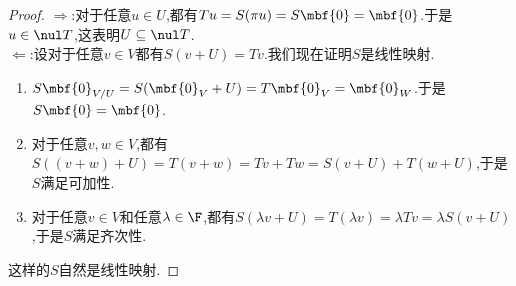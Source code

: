 \documentclass{ctexart}
\begin{document}
\begin{proof}
    $\Rightarrow$:对于任意$u\in U$,都有$Tu=S(\pi u)=S\mbf{0}=\mbf{0}$.于是$u\in\nul T$,这表明$U\subseteq\nul T$.\\
    $\Leftarrow$:设对于任意$v\in V$都有$S(v+U)=Tv$.我们现在证明$S$是线性映射.
    \begin{enumerate}[label=\tbf{(\alph*)}]
        \item $S\mbf{0}_{V/U}=S(\mbf{0}_V+U)=T\mbf{0}_V=\mbf{0}_W$.于是$S\mbf{0}=\mbf{0}$.
        \item 对于任意$v,w\in V$,都有$S((v+w)+U)=T(v+w)=Tv+Tw=S(v+U)+T(w+U)$,于是$S$满足可加性.
        \item 对于任意$v\in V$和任意$\lambda\in\F$,都有$S(\lambda v+U)=T(\lambda v)=\lambda Tv=\lambda S(v+U)$,于是$S$满足齐次性.
    \end{enumerate}
    这样的$S$自然是线性映射.
\end{proof}
\end{document}
